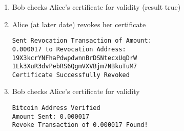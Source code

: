 \documentclass{llncs}
\begin{document}
\begin{enumerate}
\item Bob checks Alice's certificate for validity (result true)
\item Alice (at later date) revokes her certificate
\begin{verbatim}
Sent Revocation Transaction of Amount: 
0.000017 to Revocation Address: 
19X3kcrYNFhaPdwpdwnnBrDSNtecxUqDrW
1Lk3XuR3dvPebRS6QgmVXVBjm7NBkuTuM7 
Certificate Successfully Revoked
\end{verbatim}

\item Bob checks Alice's certificate for validity
\begin{verbatim}
Bitcoin Address Verified
Amount Sent: 0.000017
Revoke Transaction of 0.000017 Found!
\end{verbatim}

\end{enumerate}
\end{document}
